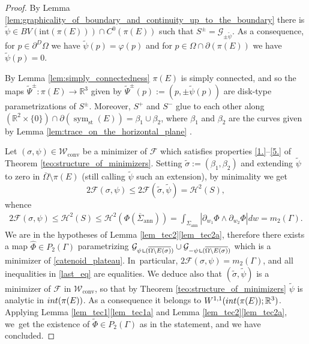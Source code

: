 \documentclass[11pt]{article}
\numberwithin{equation}{section}
\DeclareMathOperator{\sym}{sym}
\newcommand{\R}{\mathbb{R}}
\let\Om\Omega
\newcommand\admclassconv{{\mathcal W_\mathrm{conv}}}
\newcommand{\immclosedann}{\Phi({\overline\Sigma}_\mathrm{ann})}
\newcommand{\resa}{\mathop{\hbox{\vrule height 7pt width 0.5pt depth 0pt
\vrule height 0.5pt width 6pt depth 0pt}}\nolimits}
\newcommand{\resb}{\mathop{\hbox{\vrule height 4pt width 0.5pt depth 0pt
\vrule height 0.5pt width 3pt depth 0pt}}\nolimits}
\newcommand{\res}{\mathchoice{\resa}{\resa}{\resb}{\resb}}
\theoremstyle{definition}
\begin{document}
\begin{proof}
By Lemma \ref{lem:graphicality_of_boundary_and_continuity_up_to_the_boundary}
there is $\widetilde \psi\in BV(\mathrm{int}(\pi(E)))\cap C^0(\pi(E))$ such that $S^\pm=
\mathcal {G}_{\pm\widetilde\psi}$.
As a consequence, for $p\in \partial^D\Om$
we have $\widetilde\psi(p)=\varphi(p)$ and for $p\in\Omega\cap \partial (\pi(E))$
we have $\widetilde\psi(p)=0$.

By Lemma \ref{lem:simply_connectedness} $\pi(E)$ is simply connected, and so
the maps $\widetilde \Psi^\pm:\pi(E)\to \R^3$ given by
$\widetilde \Psi^\pm(p):=(p,\pm\widetilde\psi(p))$ are disk-type parametrizations of $S^\pm$.
Moreover, $S^+$ and $S^-$ glue to each other along
$(\R^2\times\{0\})\cap\partial(\sym_\mathrm{st}(E))=
\beta_1\cup\beta_2$, where $\beta_1$ and $\beta_2$
are the curves given by Lemma \ref{lem:trace_on_the_horizontal_plane} .

Let $(\sigma,\psi)\in\admclassconv$ be a minimizer of $\mathcal F$ which satisfies
properties \ref{1.}--\ref{5.} of Theorem \ref{teo:structure_of_minimizers}. Setting $\widetilde\sigma:=(\beta_1,\beta_2)$ and
extending $\widetilde\psi$ to zero in $\overline\Om\setminus \pi(E)$
(still calling $\widetilde \psi$ such an extension),
by minimality we get
\[
2\mathcal F(\sigma,\psi)\leq 2\mathcal F(\widetilde\sigma,\widetilde\psi)=\mathcal H^2(S),
\]
whence
\begin{align}\label{last_eq}
2\mathcal F(\sigma,\psi)\leq \mathcal{H}^2(S)\le\mathcal{H}^2(\immclosedann)
=\int_{\Sigma_{\mathrm{ann}}}|\partial_{w_1}\Phi\wedge\partial_{w_2}\Phi|dw=m_2(\Gamma).
\end{align}
We are in the hypotheses of Lemma \ref{lem_tec2}\ref{lem_tec2a},
therefore there exists a map $\widehat\Phi\in P_2(\Gamma)$ parametrizing $\mathcal G_{\psi\res(\overline{\Om\setminus E(\sigma)})}\cup \mathcal G_{-\psi\res(\overline{\Om\setminus E(\sigma)})}$ which is a minimizer
of \eqref{catenoid_plateau}. In~particular,
$2\mathcal F(\sigma,\psi)=m_2(\Gamma)$, and all inequalities in \eqref{last_eq} are equalities. We
deduce also that
$(\widetilde \sigma,\widetilde\psi)$ is a minimizer of $\mathcal F$ in $\admclassconv$, so that by Theorem \ref{teo:structure_of_minimizers} $\widetilde \psi$ is analytic in $\textup{int}(\pi(E))$. As a consequence it belongs to $W^{1,1}(\textup{int}(\pi(E));\R^3)$.
Applying Lemma \ref{lem_tec1}\ref{lem_tec1a} and Lemma \ref{lem_tec2}\ref{lem_tec2a}, we~get the existence of $\widetilde \Phi\in P_2(\Gamma)$ as in the statement, and we have concluded.
\end{proof}
\end{document}
